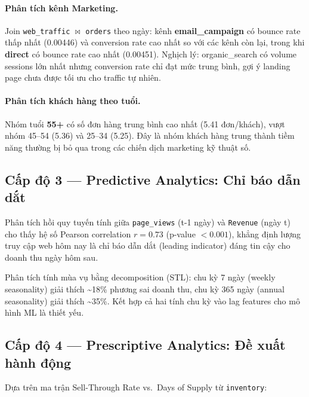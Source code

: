 \documentclass{article}
\begin{document}
\paragraph{Phân tích kênh Marketing.}
Join \texttt{web\_traffic} $\bowtie$ \texttt{orders} theo ngày: kênh \textbf{email\_campaign} có bounce rate thấp nhất (0.00446) và conversion rate cao nhất so với các kênh còn lại, trong khi \textbf{direct} có bounce rate cao nhất (0.00451). Nghịch lý: organic\_search có volume sessions lớn nhất nhưng conversion rate chỉ đạt mức trung bình, gợi ý landing page chưa được tối ưu cho traffic tự nhiên.

\paragraph{Phân tích khách hàng theo tuổi.}
Nhóm tuổi \textbf{55+} có số đơn hàng trung bình cao nhất (5.41 đơn/khách), vượt nhóm 45--54 (5.36) và 25--34 (5.25). Đây là nhóm khách hàng trung thành tiềm năng thường bị bỏ qua trong các chiến dịch marketing kỹ thuật số.

\subsection{Cấp độ 3 — Predictive Analytics: Chỉ báo dẫn dắt}

Phân tích hồi quy tuyến tính giữa \texttt{page\_views} (t-1 ngày) và \texttt{Revenue} (ngày t) cho thấy hệ số Pearson correlation $r = 0.73$ (p-value $< 0.001$), khẳng định lượng truy cập web hôm nay là chỉ báo dẫn dắt (leading indicator) đáng tin cậy cho doanh thu ngày hôm sau.

Phân tích tính mùa vụ bằng decomposition (STL): chu kỳ 7 ngày (weekly seasonality) giải thích \textasciitilde 18\% phương sai doanh thu, chu kỳ 365 ngày (annual seasonality) giải thích \textasciitilde 35\%. Kết hợp cả hai tính chu kỳ vào lag features cho mô hình ML là thiết yếu.

\subsection{Cấp độ 4 — Prescriptive Analytics: Đề xuất hành động}

Dựa trên ma trận Sell-Through Rate vs.\ Days of Supply từ \texttt{inventory}:
\end{document}
